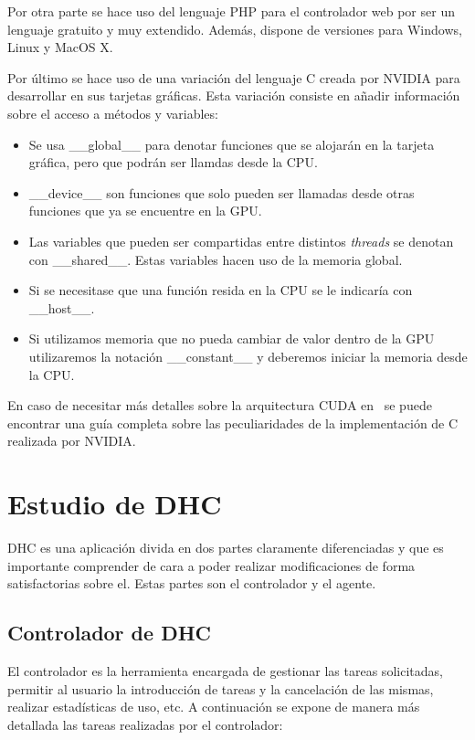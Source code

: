Por otra parte se hace uso del lenguaje PHP para el controlador web por ser un lenguaje gratuito y muy extendido. Además, dispone de versiones para Windows, Linux y MacOS X.

Por último se hace uso de una variación del lenguaje C creada por NVIDIA para desarrollar en sus tarjetas gráficas. Esta variación consiste en añadir información sobre el acceso a métodos y variables:

\begin{itemize}
	\item Se usa \_\_global\_\_ para denotar funciones que se alojarán en la tarjeta gráfica, pero que podrán ser llamdas desde la CPU.

	\item \_\_device\_\_ son funciones que solo pueden ser llamadas desde otras funciones que ya se encuentre en la GPU.
	
	\item Las variables que pueden ser compartidas entre distintos \emph{threads} se denotan con \_\_shared\_\_. Estas variables hacen uso de la memoria global.
	
	\item Si se necesitase que una función resida en la CPU se le indicaría con \_\_host\_\_.
	
	\item Si utilizamos memoria que no pueda cambiar de valor dentro de la GPU utilizaremos la notación \_\_constant\_\_ y deberemos iniciar la memoria desde la CPU.
\end{itemize}

En caso de necesitar más detalles sobre la arquitectura CUDA en~\cite{nvidia:cuda_c_programming_guide} se puede encontrar una guía completa sobre las peculiaridades de la implementación de C realizada por NVIDIA.

\section{Estudio de DHC}

DHC es una aplicación divida en dos partes claramente diferenciadas y que es importante comprender de cara a poder realizar modificaciones de forma satisfactorias sobre el. Estas partes son el controlador y el agente.

\subsection{Controlador de DHC}
El controlador es la herramienta encargada de gestionar las tareas solicitadas, permitir al usuario la introducción de tareas y la cancelación de las mismas, realizar estadísticas de uso, etc. A continuación se expone de manera más detallada las tareas realizadas por el controlador:

